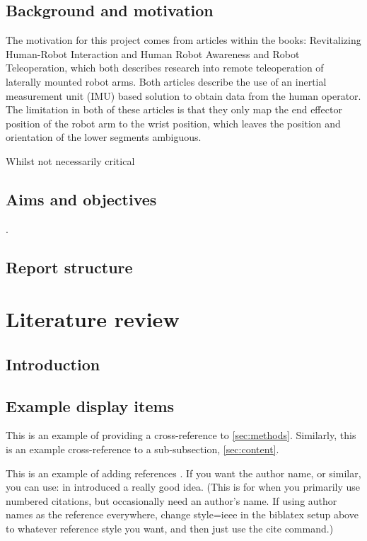   \subsection{Background and motivation}
  The motivation for this project comes from articles within the books: Revitalizing Human-Robot Interaction \cite{ref:Zhou_Yang_Wang_Dong_2025} and Human Robot Awareness and Robot Teleoperation\cite{ref:Lyu_Yang_Yang_2025}, which both describes research into remote teleoperation of laterally mounted robot arms.
  Both articles describe the use of an inertial measurement unit (IMU) based solution to obtain data from the human operator.
  The limitation in both of these articles is that they only map the end effector position of the robot arm to the wrist position, which leaves the position and orientation of the lower segments ambiguous.
  
  Whilst not necessarily critical 

  \subsection{Aims and objectives}
  \lipsum[6-7].
  
  \subsection{Report structure}
  \lipsum[8]


\section{Literature review}

  \subsection{Introduction}
    \lipsum[1] 
  
  \subsection{Example display items}
    This is an example of providing a cross-reference to \autoref{sec:methods}. Similarly, this is an example cross-reference to a sub-subsection, \autoref{sec:content}.
    
    This is an example of adding references \cite{ref:jCAS09,ref:jCAS09a,ref:jCAS10}. If you want the author name, or similar, you can use: \citeauthor*{ref:jCAS09} in \citeyear{ref:jCAS09} introduced a really good idea. (This is for when you primarily use numbered citations, but occasionally need an author's name. If using author names as the reference everywhere, change style=ieee in the biblatex setup above to whatever reference style you want, and then just use the cite command.)

